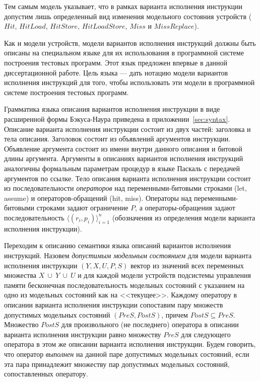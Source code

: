 Тем самым модель указывает, что в рамках варианта исполнения инструкции допустим лишь определенный вид изменения модельного состояния устройств ($Hit$, $HitLoad$, $HitStore$, $HitLoadStore$, $Miss$ и $MissReplace$).

Как и модели устройств, модели вариантов исполнения инструкций должны быть описаны на специальном языке для их использования в программной системе построения тестовых программ. Этот язык предложен впервые в данной диссертационной работе. Цель языка --- дать нотацию модели вариантов исполнения инструкций для того, чтобы использовать эти модели в программной системе построения тестовых программ.

Грамматика языка описания вариантов исполнения инструкции в виде расширенной формы Бэкуса-Наура приведена в приложении~\ref{sec:syntax}. Описание варианта исполнения инструкции состоит из двух частей: заголовка и тела описания. Заголовок состоит из объявлений аргументов инструкции. Объявление аргумента состоит из имени внутри данного описания и битовой длины аргумента. Аргументы в описаниях вариантов исполнения инструкций аналогичны формальным параметрам процедур в языке Паскаль с передачей аргументов по ссылке. Тело описания варианта исполнения инструкции состоит из последовательности \emph{операторов} над переменными-битовыми строками (let, assume) и операторов-обращений (hit, miss). Операторы над переменными-битовыми строками задают ограничение $P$, а операторы-обращения задают последовательность $\langle (r_i, p_i) \rangle_{i=1}^n$ (обозначения из определения модели варианта исполнения инструкции).

Переходим к описанию семантики языка описаний вариантов исполнения инструкций. Назовем \emph{допустимым модельным состоянием} для модели варианта исполнения инструкции $(Y, X, U, P, S)$ вектор из значений всех переменных множества $X~\cup~Y~\cup~U$ и для каждой модели устройств подсистемы управления памяти бесконечная последовательность модельных состояний с указанием на одно из модельных состояний как на <<текущее>>. Каждому оператору в описании варианта исполнения инструкции сопоставим пару множеств допустимых модельных состояний $(PreS, PostS)$, причем $PostS \subseteq PreS$. Множество $PostS$ для произвольного (не последнего) оператора в описании варианта исполнения инструкции равно множеству $PreS$ для следующего оператора в этом же описании варианта исполнения инструкции. Будем говорить, что оператор \emph{выполнен} на данной паре допустимых модельных состояний, если эта пара принадлежит множеству пар допустимых модельных состояний, сопоставленных оператору.

